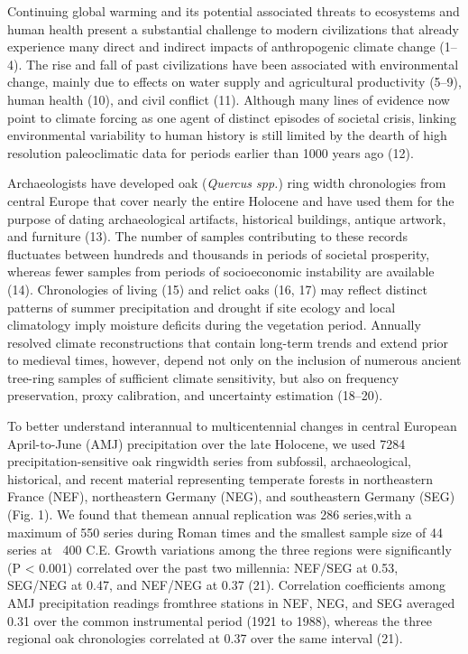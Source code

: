 \documentclass[10pt,a4paper,twoside,onecolumn]{article}
\begin{document}
\begin{myfont}
	\begin{multicols}{3}
{\huge C}ontinuing global warming and its potential associated threats to ecosystems and human health present a substantial challenge
to modern civilizations that already experience many direct and indirect impacts of anthropogenic climate change (1–4). The rise and fall of
past civilizations have been associated with environmental change, mainly due to effects on water supply and agricultural productivity (5–9), human
health (10), and civil conflict (11). Although many lines of evidence now point to climate forcing as one agent of distinct episodes of societal
crisis, linking environmental variability to human history is still limited by the dearth of high resolution paleoclimatic data for periods earlier than
1000 years ago (12). \par
Archaeologists have developed oak (\textit{Quercus spp.}) ring width chronologies from central Europe that cover nearly the entire Holocene and have used them for the purpose of dating archaeological artifacts, historical buildings, antique artwork, and furniture (13). The number of samples contributing to these records fluctuates between hundreds and thousands in periods of societal prosperity, whereas fewer samples from periods of socioeconomic instability are available (14). Chronologies of living (15) and relict oaks (16, 17) may reflect distinct patterns of summer precipitation and drought if site ecology and local climatology imply moisture deficits during the vegetation period. Annually resolved climate reconstructions that contain long-term trends and extend prior to
medieval times, however, depend not only on the inclusion of numerous ancient tree-ring samples of sufficient climate sensitivity, but also on frequency
preservation, proxy calibration, and uncertainty estimation (18–20). \par
To better understand interannual to multicentennial changes in central European April-to-June (AMJ) precipitation over the late Holocene, we used 7284 precipitation-sensitive oak ringwidth series from subfossil, archaeological, historical, and recent material representing temperate forests
in northeastern France (NEF), northeastern Germany (NEG), and southeastern Germany (SEG) (Fig. 1). We found that themean annual replication was 286
series,with a maximum of 550 series during Roman times and the smallest sample size of 44 series at ~400 C.E. Growth variations among the three
regions were significantly (P < 0.001) correlated over the past two millennia: NEF/SEG at 0.53, SEG/NEG at 0.47, and NEF/NEG at 0.37 (21). Correlation coefficients among AMJ precipitation readings fromthree stations in NEF, NEG, and SEG averaged 0.31 over the common instrumental period (1921 to 1988), whereas the three regional oak chronologies correlated at 0.37 over the same interval (21). \par

\end{multicols}
\end{myfont}
\end{document}
